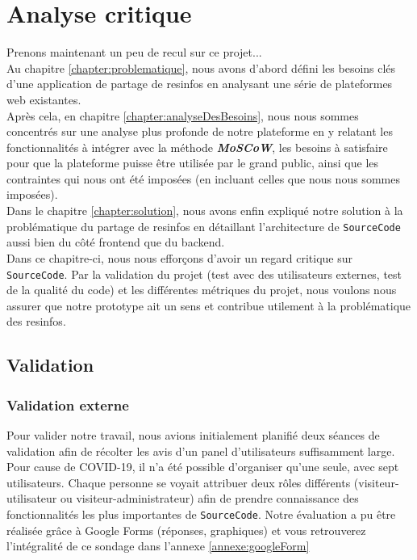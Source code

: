 \chapter{Analyse critique}

Prenons maintenant un peu de recul sur ce projet...\\

Au chapitre \ref{chapter:problematique}, nous avons d'abord défini les besoins clés d'une application de partage de \glspl{resinfo} en analysant une série de plateformes web existantes.\\

Après cela, en chapitre \ref{chapter:analyseDesBesoins}, nous nous sommes concentrés sur une analyse plus profonde de notre plateforme en y relatant les fonctionnalités à intégrer avec la méthode \textbf{\textit{MoSCoW}}, les besoins à satisfaire pour que la plateforme puisse être utilisée par le grand public, ainsi que les contraintes qui nous ont été imposées (en incluant celles que nous nous sommes imposées).\\

Dans le chapitre \ref{chapter:solution}, nous avons enfin expliqué notre solution à la problématique du partage de \glspl{resinfo} en détaillant l'architecture de \texttt{SourceCode} aussi bien du côté \gls{frontend} que du \gls{backend}.\\

Dans ce chapitre-ci, nous nous efforçons d'avoir un regard critique sur \texttt{SourceCode}. Par la validation du projet (test avec des utilisateurs externes, test de la qualité du code) et les différentes métriques du projet, nous voulons nous assurer que notre prototype ait un sens et contribue utilement à la problématique des \glspl{resinfo}.

\section{Validation}
\label{section:validation}

\subsection{Validation externe}
\label{section:validationExterne}

Pour valider notre travail, nous avions initialement planifié deux séances de validation afin de récolter les avis d'un panel d'utilisateurs suffisamment large.
Pour cause de COVID-19, il n'a été possible d'organiser qu'une seule, avec sept utilisateurs. Chaque personne se voyait attribuer deux rôles différents (visiteur-utilisateur ou visiteur-administrateur) afin de prendre connaissance des fonctionnalités les plus importantes de \texttt{SourceCode}. Notre évaluation a pu être réalisée grâce à Google Forms (réponses, graphiques) et vous retrouverez l'intégralité de ce sondage dans l'annexe \ref{annexe:googleForm}\\

